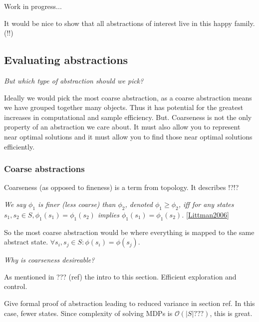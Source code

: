 {\color{red}Work in progress...}

It would be nice to show that all abstractions of interest live in this happy family. (!!)


\subsection{Evaluating abstractions}

\begin{displayquote}
\textit{But which type of abstraction should we pick?}
\end{displayquote}

Ideally we would pick the most coarse abstraction, as a coarse abstraction means we have grouped together many objects.
Thus it has potential for the greatest increases in computational and sample efficiency.
But. Coarseness is not the only property of an abstraction we care about.
It must also allow you to represent near optimal solutions and it must allow you to find those near optimal solutions efficiently.


\subsubsection{Coarse abstractions}

Coarseness (as opposed to fineness) is a term from topology. It describes !?!?

\textit{We say $\phi_1$ is finer (less coarse) than $\phi_2$, denoted $\phi_1 \ge \phi_2$,
iff for any states $s_1, s_2 \in S, \phi_1(s_1) = \phi_1(s_2)$ implies $\phi_1(s_1) = \phi_1(s_2)$.} \ref{Littman2006}\footnotemark[8]


So the most coarse abstraction would be where everything is mapped to the same abstract state.
$\forall s_i, s_j\in S: \phi(s_i)=\phi(s_j)$.

\begin{displayquote}
\textit{Why is coarseness desireable?}
\end{displayquote}

As mentioned in ??? (ref) the intro to this section. Efficient exploration and control.

Give formal proof of abstraction leading to reduced variance in section ref.
In this case, fewer states. Since complexity of solving MDPs is $\mathcal O(|S| ???)$, this is great.

